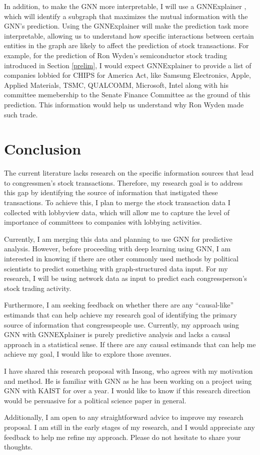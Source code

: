 \documentclass[15pt,letterpaper]{article}
\begin{document}
In addition, to make the GNN more interpretable, I will use a GNNExplainer \citep{gnne}, which will identify a subgraph that maximizes the mutual information with the GNN's prediction. 
Using the GNNExplainer will make the prediction task more interpretable, allowing us to understand how specific interactions between certain entities in the graph are likely to affect the prediction of stock transactions.
For example, for the prediction of Ron Wyden's semiconductor stock trading introduced in Section \ref{prelim}, I would expect GNNExplainer to provide a list of companies lobbied for CHIPS for America Act, like Samsung Electronics, Apple, Applied Materials, TSMC, QUALCOMM, Microsoft, Intel along with his committee memebership to the Senate Finance Committee as the ground of this prediction.
This information would help us understand why Ron Wyden made such trade.

\section{Conclusion}
The current literature lacks research on the specific information sources that lead to congressmen's stock transactions. Therefore, my research goal is to address this gap by identifying the source of information that instigated these transactions. To achieve this, I plan to merge the stock transaction data I collected with lobbyview data, which will allow me to capture the level of importance of committees to companies with lobbying activities.

Currently, I am merging this data and planning to use GNN for predictive analysis. However, before proceeding with deep learning using GNN, I am interested in knowing if there are other commonly used methods by political scientists to predict something with graph-structured data input. For my research, I will be using network data as input to predict each congressperson's stock trading activity.

Furthermore, I am seeking feedback on whether there are any ``causal-like'' estimands that can help achieve my research goal of identifying the primary source of information that congresspeople use. Currently, my approach using GNN with GNNEXplainer is purely predictive analysis and lacks a causal approach in a statistical sense. If there are any causal estimands that can help me achieve my goal, I would like to explore those avenues.

I have shared this research proposal with Insong, who agrees with my motivation and method. He is familiar with GNN as he has been working on a project using GNN with KAIST for over a year. I would like to know if this research direction would be persuasive for a political science paper in general.

Additionally, I am open to any straightforward advice to improve my research proposal. I am still in the early stages of my research, and I would appreciate any feedback to help me refine my approach. Please do not hesitate to share your thoughts.




\end{document}
